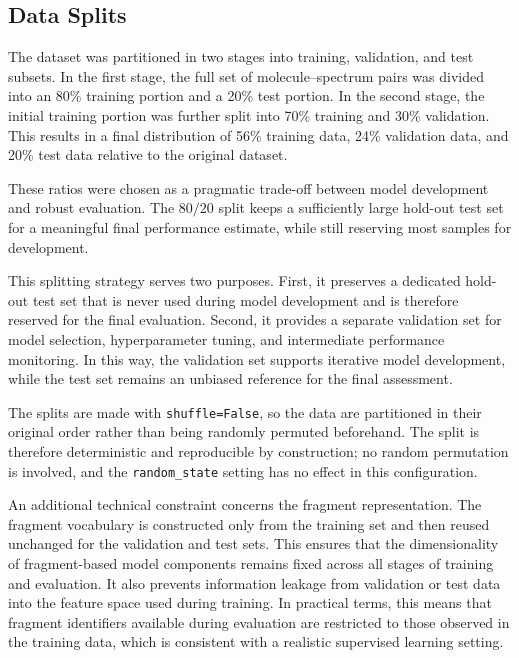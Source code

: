 \subsection{Data Splits}
\label{sec:data-splits}

The dataset was partitioned in two stages into training, validation, and test subsets.
In the first stage, the full set of molecule--spectrum pairs was divided into an 80\% training portion and a 20\% test portion.
In the second stage, the initial training portion was further split into 70\% training and 30\% validation.
This results in a final distribution of 56\% training data, 24\% validation data, and 20\% test data relative to the original dataset.

These ratios were chosen as a pragmatic trade-off between model development and robust evaluation.
The $80/20$ split keeps a sufficiently large hold-out test set for a meaningful final performance estimate, while still reserving most samples for development.

This splitting strategy serves two purposes.
First, it preserves a dedicated hold-out test set that is never used during model development and is therefore reserved for the final evaluation.
Second, it provides a separate validation set for model selection, hyperparameter tuning, and intermediate performance monitoring.
In this way, the validation set supports iterative model development, while the test set remains an unbiased reference for the final assessment.

The splits are made with \texttt{shuffle=False}, so the data are partitioned in their original order rather than being randomly permuted beforehand.
The split is therefore deterministic and reproducible by construction; no random permutation is involved, and the \texttt{random\_state} setting has no effect in this configuration.

An additional technical constraint concerns the fragment representation.
The fragment vocabulary is constructed only from the training set and then reused unchanged for the validation and test sets.
This ensures that the dimensionality of fragment-based model components remains fixed across all stages of training and evaluation.
It also prevents information leakage from validation or test data into the feature space used during training.
In practical terms, this means that fragment identifiers available during evaluation are restricted to those observed in the training data, which is consistent with a realistic supervised learning setting.


